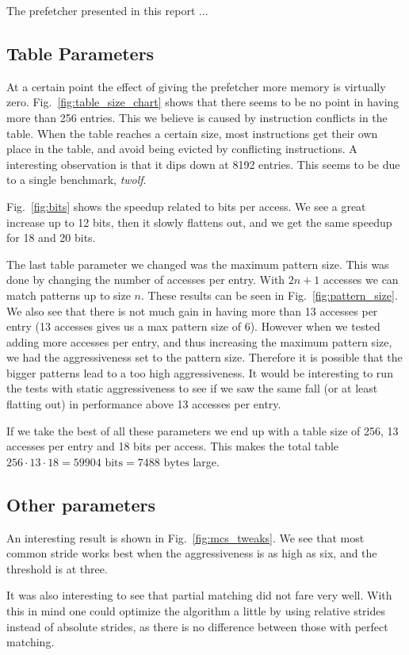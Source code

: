 The prefetcher presented in this report ...

\subsection{Table Parameters}
At a certain point the effect of giving the prefetcher more memory is virtually
zero. Fig.~\ref{fig:table_size_chart} shows that there seems to be no point in
having more than 256 entries. This we believe is caused by instruction
conflicts in the table. When the table reaches a certain size, most
instructions get their own place in the table, and avoid being evicted by
conflicting instructions.
A interesting observation is that it dips down at 8192 entries. This seems
to be due to a single benchmark, \emph{twolf}.

Fig.~\ref{fig:bits} shows the speedup related to bits per access.
We see a great increase up to 12 bits, then it slowly flattens out,
and we get the same speedup for 18 and 20 bits.

The last table parameter we changed was the maximum pattern size.
This was done by changing the number of accesses per entry.
With $2n+1$ accesses we can match patterns up to size $n$.
These results can be seen in Fig.~\ref{fig:pattern_size}.
We also see that there is not much gain in having more than 13
accesses per entry (13 accesses gives us a max pattern size of 6).
However when we tested adding more accesses per entry, and thus
increasing the maximum pattern size, we had the aggressiveness
set to the pattern size. Therefore it is possible that the bigger
patterns lead to a too high aggressiveness. It would be interesting
to run the tests with static aggressiveness to see if we saw the
same fall (or at least flatting out) in performance above 13 accesses
per entry.

If we take the best of all these parameters we end up with a table size
of 256, 13 accesses per entry and 18 bits per access. This makes
the total table $256 \cdot 13 \cdot 18 = 59904 \textrm{ bits} = 7488 \textrm{ bytes}$ large.

\subsection{Other parameters}
An interesting result is shown in Fig.~\ref{fig:mcs_tweaks}.
We see that most common stride works best when the aggressiveness
is as high as six, and the threshold is at three.

It was also interesting to see that partial matching did not fare very well.
With this in mind one could optimize the algorithm a little by using relative
strides instead of absolute strides, as there is no difference between those
with perfect matching.
